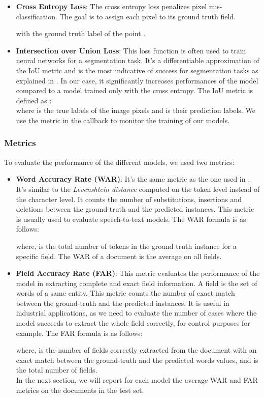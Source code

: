 \documentclass[conference]{IEEEtran}
\begin{document}
\begin{itemize}
\item \textbf{Cross Entropy Loss}: The cross entropy loss penalizes pixel mis-classification. The goal is to assign each pixel to  its ground truth field.


with  the ground truth label of the point .\\

\item \textbf{Intersection over Union Loss}: This loss function is often used to train neural networks for a segmentation task. It's a differentiable approximation of the IoU metric and is the most indicative of success for segmentation tasks as explained in \cite{IoU}. In our case, it significantly increases performances of the model compared to a model trained only with the cross entropy. The IoU metric is defined as : \\


where  is the true labels of the image pixels and  is their prediction labels. We use the  metric in the callback to monitor the training of our models.

\end{itemize}

\subsubsection{Metrics}\hfill

To evaluate the performance of the different models, we used two metrics:
\begin{itemize}
    \item \textbf{Word Accuracy Rate (WAR)}: It's the same metric as the one used in \cite{chargrid}. It's similar to the \textit{Levenshtein distance}  computed on the token level instead of the character level. It counts the number of substitutions, insertions and deletions between the ground-truth and the predicted instances. This metric is usually used to evaluate speech-to-text models. The WAR formula is as follows:
    

where,  is the total number of tokens in the ground truth instance for a specific field. The WAR of a document is the average on all fields. 

 \item \textbf{Field Accuracy Rate (FAR)}: This metric evaluates the performance of the model in extracting  complete and exact field information. A field is the set of words of a same entity. This metric counts the number of exact match between the ground-truth and the predicted instances. It is useful in industrial applications, as we need to evaluate the number of cases where the model succeeds to extract the whole field correctly, for control purposes for example. The FAR formula is as follows:
 
where,  is the number of fields correctly extracted from the document with an exact match between  the ground-truth and the predicted words values, and  is the total number of fields.\\
In the next section, we will report for each model the average WAR and FAR metrics on the documents in the test set.
\end{itemize}
\end{document}
